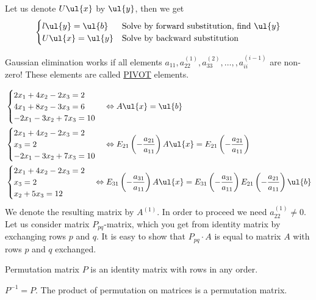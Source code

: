 Let us denote $U\ul{x}$ by $\ul{y}$, then we get
\[
\begin{cases}
l\ul{y} = \ul{b} & \text{Solve by forward substitution, find $\ul{y}$}\\
U\ul{x} = \ul{y} & \text{Solve by backward substitution}\\
\end{cases}
\]
\begin{remark}
Gaussian elimination works if all elements $a_{11},a_{22}^{(1)},a_{33}^{(2)},\dots, ,a_{ii}^{(i-1)}$ are non-zero! These elements are called \underline{PIVOT} elements.
\end{remark}
\begin{example}
\begin{align*}
&\begin{cases}
2x_1 + 4x_2 - 2x_3 = 2\\
4x_1 + 8x_2 - 3x_3 = 6\\
-2x_1 -3x_2 + 7x_3 = 10\\
\end{cases} \Leftrightarrow A\ul{x} = \ul{b}\\
&\begin{cases}
2x_1 + 4x_2 - 2x_3 = 2\\
x_3 = 2\\
-2x_1 -3x_2 +7x_3 = 10\\
\end{cases}\Leftrightarrow E_{21}\left( -\frac{a_{21}}{a_{11}}\right) A\ul{x} = E_{21}\left( -\frac{a_{21}}{a_{11}}\right)\\
&\begin{cases}
2x_1 + 4x_2 - 2x_3 = 2\\
x_3 = 2\\
x_2 + 5x_3 = 12\\
\end{cases}\Leftrightarrow E_{31}\left( -\frac{a_{31}}{a_{11}}\right)  A\ul{x} = E_{31}\left( -\frac{a_{31}}{a_{11}}\right) E_{21}\left( -\frac{a_{21}}{a_{11}}\right) \ul{b}\\
\end{align*}
We denote the resulting matrix by $A^{(1)}$. In order to proceed we need $a_{22}^{(1)} \not=0$. Let us consider matrix $P_{pq}$-matrix, which you get from identity matrix by exchanging rows $p$ and $q$. It is easy to show that $P_{pq}\cdot A$ is equal to matrix $A$ with rows $p$ and $q$ exchanged. 
\begin{definition}
Permutation matrix $P$ is an identity matrix with rows in any order.
\end{definition}
\begin{remark}
$P^{-1} = P$. The product of permutation on matrices is a permutation matrix. 	
\end{remark}\\


\end{example}
